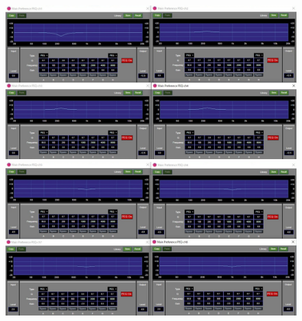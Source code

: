 \documentclass[11pt,a4j]{jreport}
\begin{document}

\newpage
{}
\begin{figure}[H]
  \begin{minipage}[b]{.5\linewidth}
    \centering
    \includegraphics[width=.9\linewidth]{images/experimentField/afcParameters/02beta/05manualEQ6.jpg}
  \end{minipage}%
  \begin{minipage}[b]{.5\linewidth}
    \centering
    \includegraphics[width=.9\linewidth]{images/experimentField/afcParameters/02beta/05manualEQ7.jpg}
  \end{minipage}


\end{figure}
\end{document}
